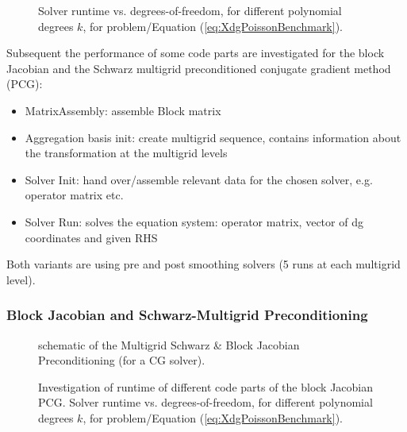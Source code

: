 \begin{figure}[!h]
	\begin{center}
		
	\end{center}
	\caption{
		Solver runtime vs. degrees-of-freedom, for different polynomial degrees $k$,
		for problem/Equation (\ref{eq:XdgPoissonBenchmark}).
	}
	\label{fig:XdgRuntimes}
\end{figure}
\newpage
Subsequent the performance of some code parts are investigated for the block Jacobian and the Schwarz multigrid preconditioned conjugate gradient method (PCG):
\begin{itemize}
	\item MatrixAssembly: assemble Block matrix
	\item Aggregation basis init: create multigrid sequence, contains information about the transformation at the multigrid levels
	\item Solver Init: hand over/assemble relevant data for the chosen solver, e.g. operator matrix etc.
	\item Solver Run: solves the equation system: operator matrix, vector of dg coordinates and given RHS 
\end{itemize}
Both variants are using pre and post smoothing solvers (5 runs at each multigrid level).

\subsubsection{Block Jacobian and Schwarz-Multigrid Preconditioning}

\begin{figure}[!h]
	\begin{center}
		
	\end{center}
	\caption{
		schematic of the Multigrid Schwarz \& Block Jacobian Preconditioning (for a CG solver).
	}
	\label{fig:schema_BlockPCG_2}
\end{figure}

\begin{figure}[!h]
	\begin{center}
		
	\end{center}
	\caption{
		Investigation of runtime of different code parts of the block Jacobian PCG. Solver runtime vs. degrees-of-freedom, for different polynomial degrees $k$,
		for problem/Equation (\ref{eq:XdgPoissonBenchmark}).
	}
	\label{fig:Xdg_blockJacobianPCG}
\end{figure}

